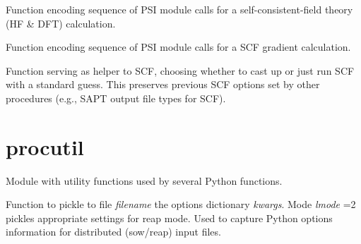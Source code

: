 \documentclass[letterpaper,10pt,english]{sphinxmanual}
\begin{document}

\begin{fulllineitems}
\label{index:proc.run_scf}
Function encoding sequence of PSI module calls for
a self-consistent-field theory (HF \& DFT) calculation.

\end{fulllineitems}


\begin{fulllineitems}
\label{index:proc.run_scf_gradient}
Function encoding sequence of PSI module calls for
a SCF gradient calculation.

\end{fulllineitems}


\begin{fulllineitems}
\label{index:proc.scf_helper}
Function serving as helper to SCF, choosing whether to cast
up or just run SCF with a standard guess. This preserves
previous SCF options set by other procedures (e.g., SAPT
output file types for SCF).

\end{fulllineitems}



\section{procutil}
\label{index:procutil}\label{index:module-procutil}
Module with utility functions used by several Python functions.

\begin{fulllineitems}
\label{index:procutil.format_kwargs_for_input}
Function to pickle to file \emph{filename} the options dictionary
\emph{kwargs}. Mode \emph{lmode} =2 pickles appropriate settings for
reap mode. Used to capture Python options information for
distributed (sow/reap) input files.

\end{fulllineitems}
\end{document}
